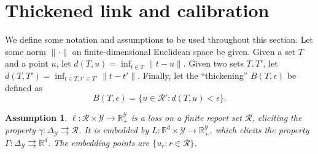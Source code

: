 \documentclass[12pt]{article}
\newcommand{\Comments}{1}
\newcommand{\mynote}[2]{\ifnum\Comments=1\textcolor{#1}{#2}\fi}
\newcommand{\raf}[1]{\mynote{green}{[RF: #1]}}
\newcommand{\reals}{\mathbb{R}}
\newcommand{\prop}[1]{\mathrm{prop}[#1]}
\newcommand{\simplex}{\Delta_\Y}
\newcommand{\R}{\mathcal{R}}
\newcommand{\U}{\mathcal{U}}
\newcommand{\Y}{\mathcal{Y}}
\newcommand{\toto}{\rightrightarrows}
\newcommand{\trim}{\mathrm{trim}}
\newtheorem{assumption}{Assumption}
\begin{document}
%  

\section{Thickened link and calibration} \label{app:calibration}

We define some notation and assumptions to be used throughout this section.
Let some norm $\|\cdot\|$ on finite-dimensional Euclidean space be given.
Given a set $T$ and a point $u$, let $d(T,u) = \inf_{t \in T} \|t-u\|$.
Given two sets $T,T'$, let $d(T,T') = \inf_{t\in T, t' \in T'} \|t-t'\|$.
Finally, let the ``thickening'' $B(T,\epsilon)$ be defined as
  \[ B(T,\epsilon) = \{u \in \R' : d(T,u) < \epsilon \} . \]

\begin{assumption} \label{assume:cal}
  $\ell: \R \times \Y \to \reals^{\Y}_+$ is a loss on a finite report set $\R$, eliciting the property $\gamma: \simplex \toto \R$.
  It is embedded by $L: \reals^d \times \Y \to \reals^{\Y}_+$, which elicits the property $\Gamma: \simplex \toto \reals^d$.
  The embedding points are $\{u_r : r \in \R\}$.
\end{assumption}
\end{document}
